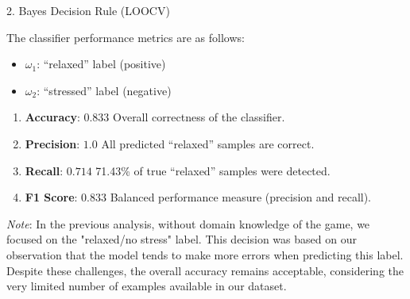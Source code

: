 \documentclass[aspectratio=169,xcolor=dvipsnames]{beamer}
\begin{document}

\begin{frame}{2. Bayes Decision Rule (LOOCV)}

    The classifier performance metrics are as follows:
    \begin{itemize}
        \item $\omega_1$: ``relaxed'' label (positive)
        \item $\omega_2$: ``stressed'' label (negative)
    \end{itemize}
    
    \begin{enumerate}
        \item \textbf{Accuracy}: $0.833$  
        Overall correctness of the classifier.
    
        \item \textbf{Precision}: $1.0$  
        All predicted ``relaxed'' samples are correct.
    
        \item \textbf{Recall}: $0.714$  
        71.43\% of true ``relaxed'' samples were detected.
    
        \item \textbf{F1 Score}: $0.833$  
        Balanced performance measure (precision and recall).
    \end{enumerate}
    
    \textit{Note}: In the previous analysis, without domain knowledge of the game, we focused on the "relaxed/no stress" label. This decision was based on our observation that the model tends to make more errors when predicting this label. Despite these challenges, the overall accuracy remains acceptable, considering the very limited number of examples available in our dataset.

    
\end{frame}

\end{document}
